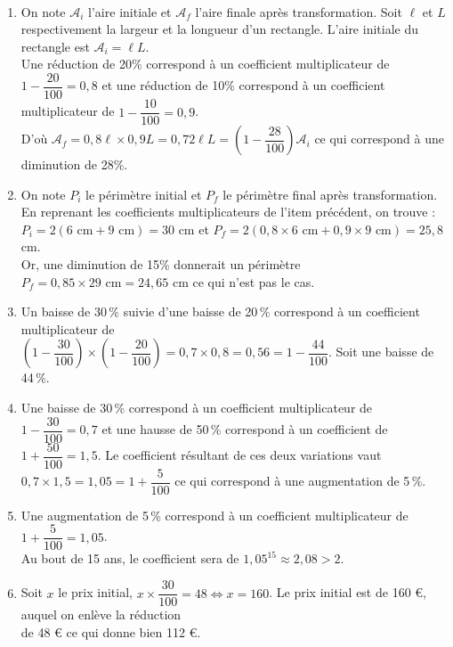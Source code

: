 \ \\ [-5mm]
\begin{enumerate}
   \item On note $\mathcal{A}_i$ l'aire initiale et $\mathcal{A}_f$ l'aire finale après transformation. Soit $\ell$ et $L$ respectivement la largeur et la longueur d'un rectangle. L'aire initiale du rectangle est $\mathcal{A}_i =\ell L$. \\
   Une réduction de 20\% correspond à un coefficient multiplicateur de $1-\dfrac{20}{100} =0,8$ et une réduction de 10\% correspond à un coefficient multiplicateur de $1-\dfrac{10}{100} =0,9$. \\
    D'où $\mathcal{A}_f =0,8\ell\times0,9L =0,72\ell L =\left(1-\dfrac{28}{100}\right)\mathcal{A}_i$ ce qui correspond à une diminution de 28\%. \\
   \item On note $P_i$ le périmètre initial et $P_f$ le périmètre final après transformation. En reprenant les coefficients multiplicateurs de l'item précédent, on trouve : \\
   $P_i =2(6\text{ cm}+9\text{ cm}) =30$ cm et $P_f =2(0,8\times6\text{ cm}+0,9\times9\text{ cm}) =25,8$ cm. \\
   Or, une diminution de 15\% donnerait un périmètre $P_f =0,85\times29\text{ cm} =24,65$ cm ce qui n'est pas le cas. \\
    \item Un baisse de 30\,\% suivie d'une baisse de 20\,\% correspond à un coefficient multiplicateur de \\ [1mm]
    $\left(1-\dfrac{30}{100}\right)\times\left(1-\dfrac{20}{100}\right) =0,7\times0,8 =0,56 =1-\dfrac{44}{100}$. Soit une baisse de 44\,\%. \\ [1mm]
\end{enumerate}
\Coupe
\begin{enumerate}
\setcounter{enumi}{3}
    \item Une baisse de 30\,\% correspond à un coefficient multiplicateur de $1-\dfrac{30}{100} =0,7$ et une hausse de 50\,\% correspond à un coefficient de $1+\dfrac{50}{100} =1,5$. Le coefficient résultant de ces deux variations vaut $0,7\times1,5 =1,05 =1+\dfrac{5}{100}$ ce qui correspond à une augmentation de 5\,\%. \\ [1mm]
   \item Une augmentation de 5\,\% correspond à un coefficient multiplicateur de $1+\dfrac{5}{100} =1,05$. \\
   Au bout de 15 ans, le coefficient sera de $1,05^{15} \approx2,08 >2$. \\ [1mm]
   \item Soit $x$ le prix initial, $x\times\dfrac{30}{100} =48 \iff x =160$. Le prix initial est de 160 \euro{}, auquel on enlève la réduction \\ [1mm]
   de 48 \euro{} ce qui donne bien 112 \euro. \\ [1mm]
\end{enumerate}

